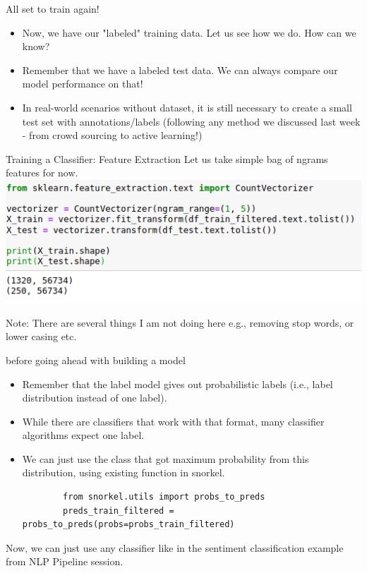 \documentclass{beamer}
\begin{document}
\begin{frame}{All set to train again!}
    \begin{itemize}
        \item Now, we have our "labeled" training data. Let us see how we do. How can we know?
   \pause   \item Remember that we have a labeled test data. We can always compare our model performance on that!
   \item In real-world scenarios without dataset, it is still necessary to create a small test set with annotations/labels (following any method we discussed last week - from crowd sourcing to active learning!)
    \end{itemize}
\end{frame}

\begin{frame}{Training a Classifier: Feature Extraction}
    Let us take simple bag of ngrams features for now.
    \includegraphics[width=\textwidth]{figures/simplefeaturerep.png}
    
    Note: There are several things I am not doing here e.g., removing stop words, or lower casing etc. 
\end{frame}

\begin{frame}[fragile]{before going ahead with building a model}
    \begin{itemize}
    \item Remember that the label model gives out probabilistic labels (i.e., label distribution instead of one label). 
    \item While there are classifiers that work with that format, many classifier algorithms expect one label.
    \item We can just use the class that got maximum probability from this distribution, using existing function in snorkel.
    \tiny
    \begin{verbatim}
        from snorkel.utils import probs_to_preds
        preds_train_filtered = probs_to_preds(probs=probs_train_filtered)
    \end{verbatim}
    \end{itemize}
    Now, we can just use any classifier like in the sentiment classification example from NLP Pipeline session.
\end{frame}
\end{document}
